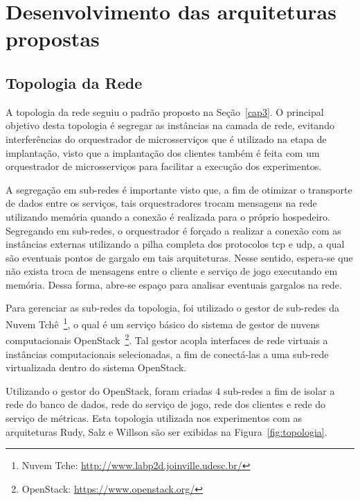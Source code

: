  
\chapter{Desenvolvimento das arquiteturas propostas}
\label{cap5}


\section{Topologia da Rede}
\label{sec:topologia}

A topologia da rede seguiu o padrão proposto na Seção~\ref{cap3}.
%
O principal objetivo desta topologia é segregar as instâncias na camada de rede, evitando interferências do orquestrador de microsserviços que é utilizado na etapa de implantação, visto que a implantação dos clientes também é feita com um orquestrador de microsserviços para facilitar a execução dos experimentos.

A segregação em sub-redes é importante visto que, a fim de otimizar o transporte de dados entre os serviços, tais orquestradores trocam mensagens na rede utilizando memória quando a conexão é realizada para o próprio hospedeiro.
%
Segregando em sub-redes, o orquestrador é forçado a realizar a conexão com as instâncias externas utilizando a pilha completa dos protocolos \ac{tcp} e \ac{udp}, a qual são eventuais pontos de gargalo em tais arquiteturas.
%
Nesse sentido, espera-se que não exista troca de mensagens entre o cliente e serviço de jogo executando em memória.
%
Dessa forma, abre-se espaço para analisar eventuais gargalos na rede.

Para gerenciar as sub-redes da topologia, foi utilizado o gestor de sub-redes da Nuvem Tchê~\footnote{Nuvem Tche: \url{http://www.labp2d.joinville.udesc.br/}}, o qual é um serviço básico do sistema de gestor de nuvens computacionais OpenStack~\footnote{OpenStack: \url{https://www.openstack.org/}}.
%
Tal gestor acopla interfaces de rede virtuais a instâncias computacionais selecionadas, a fim de conectá-las a uma sub-rede virtualizada dentro do sistema OpenStack.

Utilizando o gestor do OpenStack, foram criadas 4 sub-redes a fim de isolar a rede do banco de dados, rede do serviço de jogo, rede dos clientes e rede do serviço de métricas.
%
Esta topologia utilizada nos experimentos com as arquiteturas Rudy, Salz e Willson são ser exibidas na Figura~\ref{fig:topologia}.


